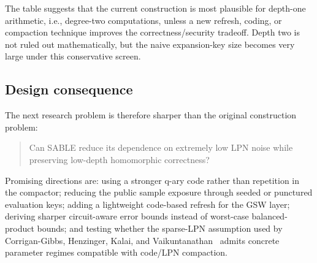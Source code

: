 The table suggests that the current construction is most plausible for depth-one arithmetic, i.e., degree-two computations, unless a new refresh, coding, or compaction technique improves the correctness/security tradeoff.  Depth two is not ruled out mathematically, but the naive expansion-key size becomes very large under this conservative screen.

\subsection{Design consequence}

The next research problem is therefore sharper than the original construction problem:

\begin{quote}
Can SABLE reduce its dependence on extremely low LPN noise while preserving low-depth homomorphic correctness?
\end{quote}

Promising directions are: using a stronger q-ary code rather than repetition in the compactor; reducing the public sample exposure through seeded or punctured evaluation keys; adding a lightweight code-based refresh for the GSW layer; deriving sharper circuit-aware error bounds instead of worst-case balanced-product bounds; and testing whether the sparse-LPN assumption used by Corrigan-Gibbs, Henzinger, Kalai, and Vaikuntanathan~\cite{CorriganGibbsHenzingerKalaiVaikuntanathan2024} admits concrete parameter regimes compatible with code/LPN compaction.
